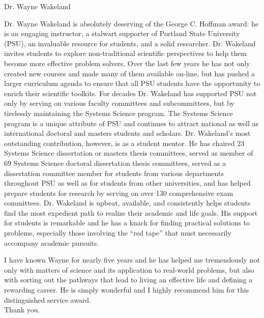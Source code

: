 \documentclass[12pt,recommendation,nosign]{university_recommendation}
\begin{document}
\begin{letter}{Dr. Wayne Wakeland}
\opening{}

Dr. Wayne Wakeland is absolutely deserving of the George C. Hoffman award: he is an engaging instructor, a stalwart supporter of Portland State University (PSU), an invaluable resource for students, and a solid researcher.  Dr. Wakeland invites students to explore non-traditional scientific perspectives to help them become more effective problem solvers. Over the last few years he has not only created new courses and made many of them available on-line, but has pushed a larger curriculum agenda to ensure that all PSU students have the opportunity to enrich their scientific toolkits. For decades Dr. Wakeland has supported PSU not only by serving on various faculty committees and subcommittees, but by tirelessly maintaining the Systems Science program. The Systems Science program is a unique attribute of PSU and continues to attract national as well as international doctoral and masters students and scholars. Dr. Wakeland's most outstanding contribution, however, is as a student mentor. He has chaired 23 Systems Science dissertation or masters thesis committees, served as member of 69 Systems Science doctoral dissertation thesis committees, served as a dissertation committee member for students from various departments throughout PSU as well as for students from other universities, and has helped prepare students for research by serving on over 130 comprehensive exam committees. Dr. Wakeland is upbeat, available, and consistently helps students find the most expedient path to realize their academic and life goals. His support for students is remarkable and he has a knack for finding practical solutions to problems, especially those involving the \enquote{red tape} that must necessarily accompany academic pursuits.

\newpage
I have known Wayne for nearly five years and he has helped me tremendously not only with matters of science and its application to real-world problems, but also with sorting out the pathways that lead to living an effective life and defining a rewarding career. He is simply wonderful and I highly recommend him for this distinguished service award.\\

Thank you.

\closing{}
\end{letter}

\signature{Bruce D. Marron, NSF IGERT Fellow\\
\url{bmarron@pdx.edu}}
		
\end{document}
